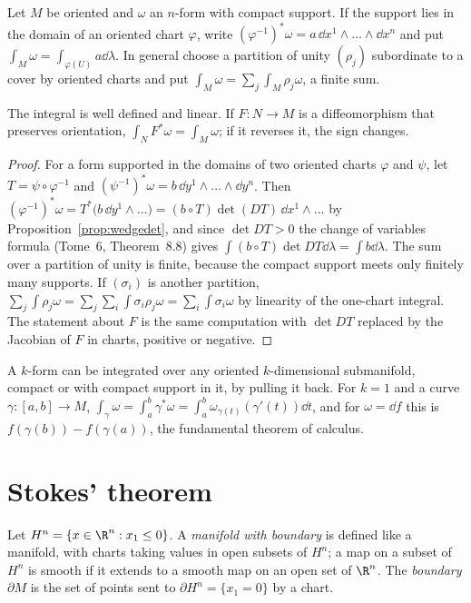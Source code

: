 \begin{definition}
Let $M$ be oriented and $\omega$ an $n$-form with compact support. If the support lies in the domain of an oriented chart $\varphi$, write
$(\varphi^{-1})^*\omega=a\,\dd x^1\wedge\dots\wedge\dd x^n$ and put $\int_M\omega=\int_{\varphi(U)}a\dd\lambda$. In general choose a partition of unity $(\rho_j)$ subordinate to a cover by
oriented charts and put $\int_M\omega=\sum_j\int_M\rho_j\omega$, a finite sum.
\end{definition}

\begin{proposition}\label{prop:intwelldef}
The integral is well defined and linear. If $F\colon N\to M$ is a diffeomorphism that preserves orientation, $\int_NF^*\omega=\int_M\omega$; if it reverses it, the sign
changes.
\end{proposition}
\begin{proof}
For a form supported in the domains of two oriented charts $\varphi$ and $\psi$, let $T=\psi\circ\varphi^{-1}$ and $(\psi^{-1})^*\omega=b\,\dd y^1\wedge\dots\wedge\dd y^n$. Then
$(\varphi^{-1})^*\omega=T^*\bigl(b\,\dd y^1\wedge\dots\bigr)=(b\circ T)\det(DT)\,\dd x^1\wedge\dots$ by Proposition~\ref{prop:wedgedet}, and since $\det DT>0$ the change of variables
formula (Tome~6, Theorem~8.8) gives $\int(b\circ T)\det DT\dd\lambda=\int b\dd\lambda$. The sum over a partition of unity is finite, because the compact support
meets only finitely many supports. If $(\sigma_i)$ is another partition,
$\sum_j\int\rho_j\omega=\sum_j\sum_i\int\sigma_i\rho_j\omega=\sum_i\int\sigma_i\omega$ by linearity of the one-chart integral. The statement about $F$ is the same computation
with $\det DT$ replaced by the Jacobian of $F$ in charts, positive or negative.
\end{proof}

A $k$-form can be integrated over any oriented $k$-dimensional submanifold, compact or with compact support in it, by pulling it back. For $k=1$ and a curve
$\gamma\colon[a,b]\to M$, $\int_\gamma\omega=\int_a^b\gamma^*\omega=\int_a^b\omega_{\gamma(t)}(\gamma'(t))\dd t$, and for $\omega=\dd f$ this is $f(\gamma(b))-f(\gamma(a))$, the
fundamental theorem of calculus.

\section{Stokes' theorem}

\begin{definition}
Let $H^n=\{x\in\R^n:x_1\le0\}$. A \emph{manifold with boundary} is defined like a manifold, with charts taking values in open subsets of $H^n$; a map on a
subset of $H^n$ is smooth if it extends to a smooth map on an open set of $\R^n$. The \emph{boundary} $\partial M$ is the set of points sent to
$\partial H^n=\{x_1=0\}$ by a chart.
\end{definition}

